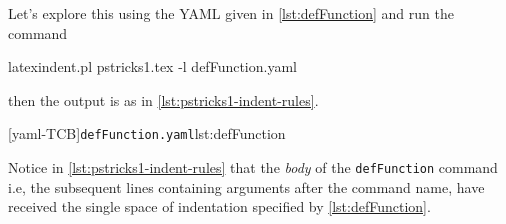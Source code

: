  \begin{example}
 Let's explore this using the YAML given in \cref{lst:defFunction} and run the command
 \begin{commandshell}
latexindent.pl pstricks1.tex -l defFunction.yaml
\end{commandshell}
 then the output is as in \cref{lst:pstricks1-indent-rules}.

 \begin{cmhtcbraster}[raster column skip=.1\linewidth]
  [yaml-TCB]{\texttt{defFunction.yaml}}{lst:defFunction}
 \end{cmhtcbraster}

 Notice in \cref{lst:pstricks1-indent-rules} that the \emph{body} of the
 \lstinline!defFunction! command i.e, the subsequent lines containing arguments after the
 command name, have received the single space of indentation specified by
 \cref{lst:defFunction}.
 \end{example}

